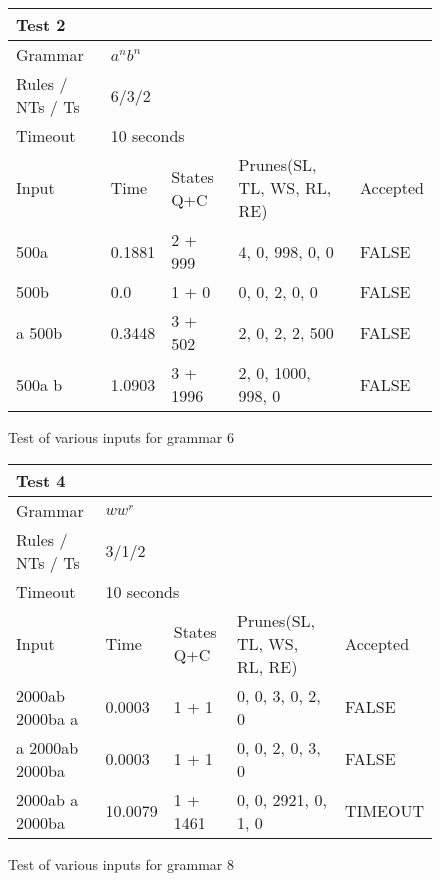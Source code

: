 \begin{figure}[h]
\centering
  \caption{Test of various inputs for grammar 6}
  \label{tab:input_compl_test_2}
\begin{tabular}{ |l|l|l|l|l|  }
  \hline
  \multicolumn{5}{|l|}{Test 2} \\
  \hline
  Grammar & \multicolumn{4}{|l|}{$a^n b^n$} \\
  Rules / NTs / Ts & \multicolumn{4}{|l|}{6/3/2} \\
  Timeout & \multicolumn{4}{|l|}{10 seconds} \\
  \hline
  Input & Time & States Q+C & Prunes(SL, TL, WS, RL, RE) & Accepted \\
  \hline
  500a & 0.1881 & 2 + 999 & 4, 0, 998, 0, 0 & FALSE \\
  500b & 0.0 & 1 + 0 & 0, 0, 2, 0, 0 & FALSE \\
  a 500b & 0.3448 & 3 + 502 & 2, 0, 2, 2, 500 & FALSE \\
  500a b & 1.0903 & 3 + 1996 & 2, 0, 1000, 998, 0  & FALSE \\
  \hline
\end{tabular}
\end{figure}


\begin{figure}[h]
\centering
  \caption{Test of various inputs for grammar 8}
  \label{tab:input_compl_test_4}
\begin{tabular}{ |l|l|l|l|l|  }
  \hline
  \multicolumn{5}{|l|}{Test 4} \\
  \hline
  Grammar & \multicolumn{4}{|l|}{$w w^r$} \\
  Rules / NTs / Ts & \multicolumn{4}{|l|}{3/1/2} \\
  Timeout & \multicolumn{4}{|l|}{10 seconds} \\
  \hline
  Input & Time & States Q+C & Prunes(SL, TL, WS, RL, RE) & Accepted \\
  \hline
  2000ab 2000ba a & 0.0003 & 1 + 1 & 0, 0, 3, 0, 2, 0 & FALSE \\
  a 2000ab 2000ba &  0.0003 & 1 + 1 & 0, 0, 2, 0, 3, 0 & FALSE \\
  2000ab a 2000ba & 10.0079 & 1 + 1461 & 0, 0, 2921, 0, 1, 0 & TIMEOUT \\
  \hline
\end{tabular}
\end{figure}

